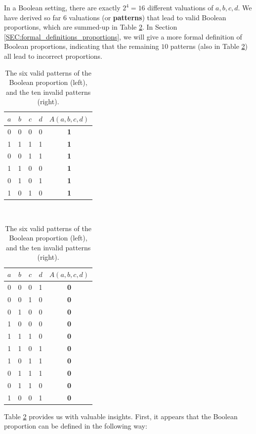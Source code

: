 In a Boolean setting, there are exactly $2^4 = 16$ different valuations of $a,
b, c, d$. We have derived so far $6$ valuations (or \textbf{patterns}) that
lead to valid Boolean proportions, which are summed-up in Table
\ref{TAB:six_valid_patterns}. In Section
\ref{SEC:formal_definitions_proportions}, we will give a more formal definition
of Boolean proportions, indicating that the remaining $10$ patterns (also in
Table \ref{TAB:six_valid_patterns}) all lead to incorrect proportions.
\begin{table}[t]
  \centering
  \begin{tabular}[t]{ccccc}
    \toprule
    $a$ & $b$ & $c$ & $d$ &  $A(a, b, c, d)$\\
    \midrule
    0 & 0 & 0 & 0 &   \textbf{1}\\
    1 & 1 & 1 & 1 &   \textbf{1}\\
    0 & 0 & 1 & 1 &   \textbf{1}\\
    1 & 1 & 0 & 0 &   \textbf{1}\\
    0 & 1 & 0 & 1 &   \textbf{1}\\
    1 & 0 & 1 & 0 &   \textbf{1}\\
    \bottomrule
  \end{tabular}
  ~~~~
  \begin{tabular}[t]{ccccc}
    \toprule
    $a$ & $b$ & $c$ & $d$ &  $A(a, b, c, d)$\\
    \midrule
    0 & 0 & 0 & 1 &   \textbf{0}\\
    0 & 0 & 1 & 0 &   \textbf{0}\\
    0 & 1 & 0 & 0 &   \textbf{0}\\
    1 & 0 & 0 & 0 &   \textbf{0}\\
    1 & 1 & 1 & 0 &   \textbf{0}\\
    1 & 1 & 0 & 1 &   \textbf{0}\\
    1 & 0 & 1 & 1 &   \textbf{0}\\
    0 & 1 & 1 & 1 &   \textbf{0}\\
    0 & 1 & 1 & 0 &   \textbf{0}\\
    1 & 0 & 0 & 1 &   \textbf{0}\\
    \bottomrule
  \end{tabular}
  \caption{The six valid patterns of the Boolean proportion (left), and the ten
  invalid patterns (right).}
  \label{TAB:six_valid_patterns}
\end{table}

Table \ref{TAB:six_valid_patterns} provides us with valuable insights.  First,
it appears that the Boolean proportion can be defined in the following way:

